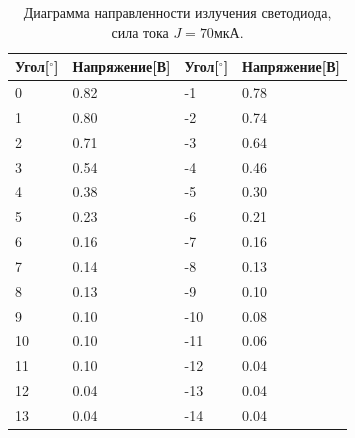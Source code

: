 \documentclass[a4paper, 12pt]{extarticle}
\begin{document}
\begin{table}[hbtp]
    \begin{center}
        \begin{tabular}{|l|l|l|l|}
            \hline
            Угол[$^{\circ}$] & Напряжение[В] & Угол[$^{\circ}$] & Напряжение[В] \\
            \hline
            0  & 0.82 & -1  & 0.78 \\
            1  & 0.80 & -2  & 0.74 \\
            2  & 0.71 & -3  & 0.64 \\
            3  & 0.54 & -4  & 0.46 \\
            4  & 0.38 & -5  & 0.30 \\
            5  & 0.23 & -6  & 0.21 \\
            6  & 0.16 & -7  & 0.16 \\
            7  & 0.14 & -8  & 0.13 \\
            8  & 0.13 & -9  & 0.10 \\
            9  & 0.10 & -10 & 0.08 \\
            10 & 0.10 & -11 & 0.06 \\
            11 & 0.10 & -12 & 0.04 \\
            12 & 0.04 & -13 & 0.04 \\
            13 & 0.04 & -14 & 0.04 \\
            \hline
        \end{tabular}
    \end{center}
    \caption{Диаграмма направленности излучения светодиода, сила тока $J = 70\text{мкА}$.}
    \label{tab:diode}
\end{table}
\end{document}
